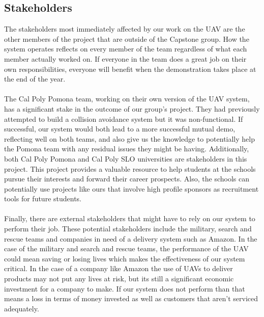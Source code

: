 \documentclass[12pt]{article}
\begin{document}
\subsection{Stakeholders}
The stakeholders most immediately affected by our work on the UAV are the other members of the project that are outside of the Capstone group. How the system operates reflects on every member of the team regardless of what each member actually worked on. If everyone in the team does a great job on their own responsibilities, everyone will benefit when the demonstration takes place at the end of the year.\\\\
The Cal Poly Pomona team, working on their own version of the UAV system, has a significant stake in the outcome of our group’s project. They had previously attempted to build a collision avoidance system but it was non-functional. If successful, our system would both lead to a more successful mutual demo, reflecting well on both teams, and also give us the knowledge to potentially help the Pomona team with any residual issues they might be having. Additionally, both Cal Poly Pomona and Cal Poly SLO universities are stakeholders in this project. This project provides a valuable resource to help students at the schools pursue their interests and forward their career prospects.  Also, the schools can potentially use projects like ours that involve high profile sponsors as recruitment tools for future students.\\\\
Finally, there are external stakeholders that might have to rely on our system to perform their job. These potential stakeholders include the military, search and rescue teams and companies in need of a delivery system such as Amazon. In the case of the military and search and rescue teams, the performance of the UAV could mean saving or losing lives which makes the effectiveness of our system critical. In the case of a company like Amazon the use of UAVs to deliver products may not put any lives at risk, but its still a significant economic investment for a company to make. If our system does not perform than that means a loss in terms of money invested as well as customers that aren’t serviced adequately.
\end{document}
